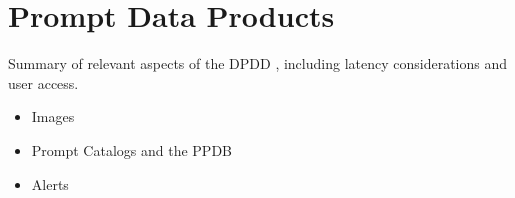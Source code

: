 \section{Prompt Data Products} \label{sec:data}


Summary of relevant aspects of the DPDD \citep{LSE-163}, including latency considerations and user access.

\begin{itemize}
  \item Images
  \item Prompt Catalogs and the PPDB
  \item Alerts
\end{itemize}


